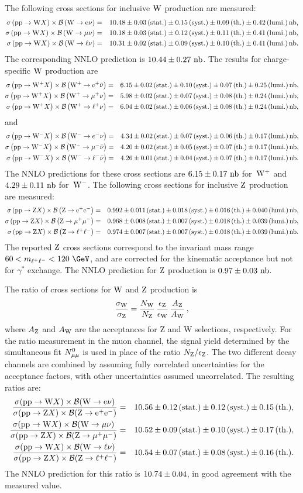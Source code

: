 The following cross sections for inclusive $\Wo$ production are measured:
{\footnotesize
\begin{eqnarray*}
 \WEISIGBR , \\
 \WMISIGBR , \\
 \WLISIGBR .
\end{eqnarray*}
}%
The corresponding NNLO prediction is $\THEORYSIGBRWI$.
The results for charge-specific $\Wo$ production are
{\footnotesize
\begin{eqnarray*}
 \WEPSIGBR , \\
 \WMPSIGBR , \\
 \WLPSIGBR ,
\end{eqnarray*}
}%
and
{\footnotesize
\begin{eqnarray*}
 \WEMSIGBR , \\
 \WMMSIGBR , \\
 \WLMSIGBR .
\end{eqnarray*}
}%
The NNLO predictions for these cross sections are $\THEORYSIGBRWP$
for~$\Wp$ and $\THEORYSIGBRWM$ for~$\Wm$.
The following cross sections for inclusive $\Zo$ production are measured:
{\footnotesize
\begin{eqnarray*}
 \ZEESIGBR , \\
 \ZMMSIGBR , \\
 \ZLLSIGBR .
\end{eqnarray*}
}%
The reported $\Zo$ cross sections correspond to the
invariant mass range $60 < m_{\ell^+\ell^-} < 120~\GeV$, and
are corrected for the kinematic acceptance but not for $\gamma^*$ exchange.
The NNLO prediction for $\Zo$ production is $\THEORYSIGBRZ$.

\par
The ratio of cross sections for $\Wo$ and $\Zo$ production is
\begin{displaymath}
  \frac{\sigma_{\Wo}}{\sigma_{\Zo}} =
  \frac{N_{\Wo}}{N_{\Zo}} \,
  \frac{\epsilon_{\Zo}}{\epsilon_{\Wo}} \,
  \frac{A_{\Zo}}{A_{\Wo}} \,,
\end{displaymath}
where $A_{\Zo}$ and $A_{\Wo}$ are the acceptances for Z and W selections, respectively.
For the ratio measurement in the muon channel, the signal yield determined by the 
simultaneous fit $\NZtomumu$ is used in place of the ratio $N_{\Zo}/\epsilon_{\Zo}$.
The two different decay channels
are combined by assuming fully correlated uncertainties for the
acceptance factors, with other uncertainties assumed uncorrelated.
The resulting ratios are:
\begin{eqnarray*}
  \RESRATWZE , \\
  \RESRATWZM , \\
  \RESRATWZL . \\
\end{eqnarray*}
The NNLO prediction for this ratio is $\THEORYRATIOWZ$,
in good agreement with the measured value.

